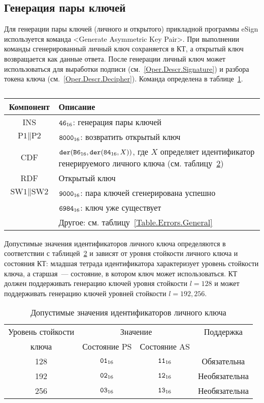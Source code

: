 \subsection{Генерация пары ключей}\label{Oper.Descr.GenKeys}

Для генерации пары ключей (личного и открытого) прикладной 
программы eSign используется команда <Generate Asymmetric Key Pair>. При 
выполнении команды сгенерированный личный ключ сохраняется в КТ,
а открытый ключ возвращается как данные ответа.
После генерации личный ключ может использоваться 
для выработки подписи (см.~\ref{Oper.Descr.Signature}) и
разбора токена ключа (см.~\ref{Oper.Descr.Decipher}).
Команда определена в таблице~\ref{Table.Oper.GenKeysCmd}.

\begin{table}[hbt]
\caption{}\label{Table.Oper.GenKeysCmd}
\begin{tabular}{|c|p{14cm}|}
\hline
Компонент & Описание\\
\hline
\hline
INS & $\texttt{46}_{16}$: генерация пары ключей\\
\hline
$\text{P1} \parallel\text{P2}$ & $\texttt{8000}_{16}$:
возвратить открытый ключ \\
\hline
CDF & $\texttt{der}(\texttt{B6}_{16},\texttt{der}(\texttt{84}_{16}, X))$,
где $X$ определяет идентификатор генерируемого личного ключа
(см. таблицу~\ref{Table.Oper.KeyRef}) \\
\hline 
\hline
RDF & Открытый ключ\\
\hline
$\text{SW1} \parallel \text{SW2}$ & 
$\texttt{9000}_{16}$: пара ключей сгенерирована успешно\\
\cline{2-2}
  & $\texttt{6984}_{16}$: ключ уже существует \\
\cline{2-2}
  & Другое: см. таблицу~\ref{Table.Errors.General} \\
\hline
\end{tabular}
\end{table}

Допустимые значения идентификаторов личного ключа определяются
в соответствии с таблицей~\ref{Table.Oper.KeyRef} и зависят от
уровня стойкости личного ключа и состояния КТ:
младшая тетрада идентификатора характеризует уровень стойкости ключа,
а старшая~--- состояние, в котором ключ может использоваться.
%
КТ должен поддерживать генерацию ключей уровня стойкости 
$l=128$ и может поддерживать генерацию ключей 
уровней стойкости $l=192,256$.

\begin{table}[hbt]
\caption{Допустимые значения идентификаторов личного ключа}
\label{Table.Oper.KeyRef}
\begin{tabular}{|c|c|c|c|}
\hline
Уровень стойкости & \multicolumn{2}{|c|}{Значение } & Поддержка\\
\cline{2-3}
ключа & Состояние PS & Состояние AS & \\
\hline
\hline
128 & $\texttt{01}_{16}$ & $\texttt{11}_{16}$ & Обязательна \\
192 & $\texttt{02}_{16}$ & $\texttt{12}_{16}$ & Необязательна\\
256 & $\texttt{03}_{16}$ & $\texttt{13}_{16}$ & Необязательна\\
\hline
\end{tabular}
\end{table}

